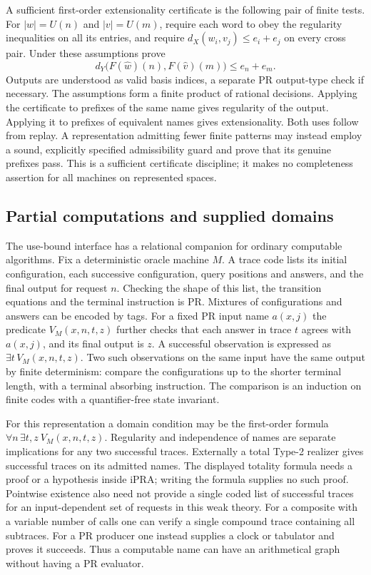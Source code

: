 A sufficient first-order extensionality certificate is the following pair
of finite tests. For $|w|=U(n)$ and $|v|=U(m)$, require each word to
obey the regularity inequalities on all its entries, and require
$d_X(w_i,v_j)\le e_i+e_j$ on every cross pair. Under these assumptions prove
\[
 d_Y\big(F(\widehat w)(n),F(\widehat v)(m)\big)\le e_n+e_m .
\]
Outputs are understood as valid basis indices, a separate PR output-type
check if necessary. The assumptions form a finite product of rational
decisions. Applying the certificate to prefixes of the same name gives
regularity of the output. Applying it to prefixes of equivalent names gives
extensionality. Both uses follow from replay. A representation admitting
fewer finite patterns may instead employ a sound, explicitly specified
admissibility guard and prove that its genuine prefixes pass. This is a
sufficient certificate discipline; it makes no completeness assertion for
all machines on represented spaces.

\subsection{Partial computations and supplied domains}

The use-bound interface has a relational companion for ordinary computable
algorithms. Fix a deterministic oracle machine $M$. A trace code lists its
initial configuration, each successive configuration, query positions and
answers, and the final output for request $n$. Checking the shape of this
list, the transition equations and the terminal instruction is PR. Mixtures
of configurations and answers can be encoded by tags. For a fixed PR input
name $a(x,j)$ the predicate
$V_M(x,n,t,z)$ further checks that each answer in trace $t$ agrees with
$a(x,j)$, and its final output is $z$. A successful observation is expressed as
$\exists t\,V_M(x,n,t,z)$. Two such observations on the same input have the
same output by finite determinism: compare the configurations up to the shorter
terminal length, with a terminal absorbing instruction. The comparison is
an induction on finite codes with a quantifier-free state invariant.

For this representation a domain condition may be the first-order formula
$\forall n\,\exists t,z\ V_M(x,n,t,z)$. Regularity and independence of names
are separate implications for any two successful traces. Externally a total
Type-2 realizer gives successful traces on its admitted names. The displayed
totality formula needs a proof or a hypothesis inside iPRA; writing the
formula supplies no such proof. Pointwise existence also need not provide a
single coded list of successful traces for an input-dependent set of requests
in this weak theory. For a composite with a variable number of calls one can
verify a single compound trace containing all subtraces. For a PR producer
one instead supplies a clock or tabulator and proves it succeeds. Thus a
computable name can have an arithmetical graph without having a PR evaluator.

